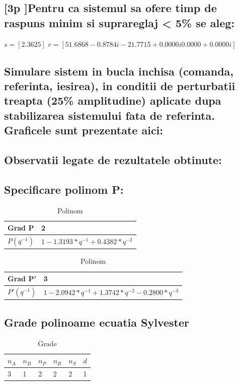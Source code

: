 \documentclass[12pt,english]{article}
\begin{document}
\subsection {[3p ]Pentru ca sistemul sa ofere timp de raspuns minim si suprareglaj < 5\% se aleg:}
$s = [2.3625]$
$r = [51.6868 - 0.8784i -21.7715 + 0.0000i   0.0000 + 0.0000i]$
\subsection {Simulare sistem in bucla inchisa (comanda, referinta, iesirea), in conditii de perturbatii treapta (25\% amplitudine) aplicate dupa stabilizarea sistemului fata de referinta. Graficele sunt prezentate aici: }
\subsection {Observatii legate de rezultatele obtinute: }

\subsection {Specificare polinom P: }
\begin{table}[H]
  \centering
    \begin{tabular}{|l|l|}
      \hline
      Grad P & 2 \\
      \hline
      $P(q^{-1})$ & $1 - 1.3193*q^{-1} + 0.4382*q^{-2}$ \\
      \hline
      
    \end{tabular}
    \caption{Polinom}
\end{table}


\begin{table}[H]
  \centering
    \begin{tabular}{|l|l|}
      \hline
      Grad P' & 3 \\
      \hline
      $P'(q^{-1})$ & $1 - 2.0942*q^{-1} + 1.3742*q^{-2} - 0.2800*q^{-3}$ \\
      \hline  
    \end{tabular}
    \caption{Polinom}
\end{table}


\subsection {Grade polinoame ecuatia Sylvester }
\begin{table}[H]
  \centering
    \begin{tabular}{|l|l|l|l|l|l|}
      \hline
      $n_A$ & $n_B$ & $n_P$ & $n_R$ & $n_S$ & $d$ \\
      \hline
      3 	& 1 	& 2 	& 2 	& 2 	& 1 \\
      \hline
    \end{tabular}
    \caption{Grade}
\end{table}
\end{document}
